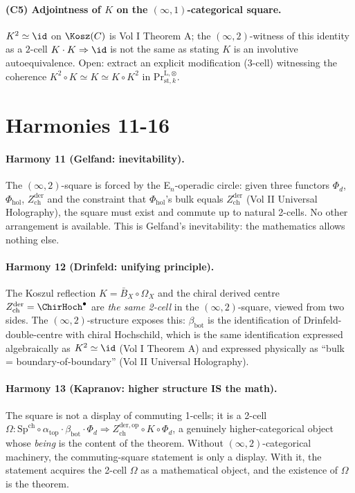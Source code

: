 \paragraph*{(C5) Adjointness of $K$ on the $(\infty,1)$-categorical square.}
$K^2\simeq\id$ on $\Kosz(C)$ is Vol I Theorem A; the $(\infty,2)$-witness
of this identity as a $2$-cell $K\cdot K\Rightarrow\id$ is not the same
as stating $K$ is an involutive autoequivalence. Open: extract an explicit
modification (3-cell) witnessing the coherence
$K^2\circ K \simeq K \simeq K\circ K^2$ in
$\mathrm{Pr}^{\mathrm{L},\otimes}_{\mathrm{st},k}$.


\section*{Harmonies 11-16}

\paragraph*{Harmony 11 (Gelfand: inevitability).} The $(\infty,2)$-square is
forced by the E$_n$-operadic circle: given three functors $\Phi_d$,
$\Phi_{\mathrm{hol}}$, $Z^{\mathrm{der}}_{\mathrm{ch}}$ and the
constraint that $\Phi_{\mathrm{hol}}$'s bulk equals
$Z^{\mathrm{der}}_{\mathrm{ch}}$ (Vol II Universal Holography), the
square must exist and commute up to natural 2-cells. No other
arrangement is available. This is Gelfand's inevitability: the
mathematics allows nothing else.

\paragraph*{Harmony 12 (Drinfeld: unifying principle).} The Koszul
reflection $K = \bar B_X\circ\Omega_X$ and the chiral derived centre
$Z^{\mathrm{der}}_{\mathrm{ch}} = \ChirHoch^\bullet$ are \emph{the same
2-cell} in the $(\infty,2)$-square, viewed from two sides. The
$(\infty,2)$-structure exposes this: $\beta_{\mathrm{bot}}$ is the
identification of Drinfeld-double-centre with chiral Hochschild, which
is the same identification expressed algebraically as
$K^{2}\simeq\id$ (Vol I Theorem A) and expressed physically as
``bulk = boundary-of-boundary'' (Vol II Universal Holography).

\paragraph*{Harmony 13 (Kapranov: higher structure IS the math).} The
square is not a display of commuting 1-cells; it is a 2-cell
$\Omega\colon
\mathrm{Sp}^{\mathrm{ch}}\circ\alpha_{\mathrm{top}}\cdot
\beta_{\mathrm{bot}}\cdot\Phi_d\Rightarrow
Z^{\mathrm{der},\mathrm{op}}_{\mathrm{ch}}\circ K\circ\Phi_d$, a
genuinely higher-categorical object whose \emph{being} is the content
of the theorem. Without $(\infty,2)$-categorical machinery, the
commuting-square statement is only a display. With it, the statement
acquires the 2-cell $\Omega$ as a mathematical object, and the
existence of $\Omega$ is the theorem.

